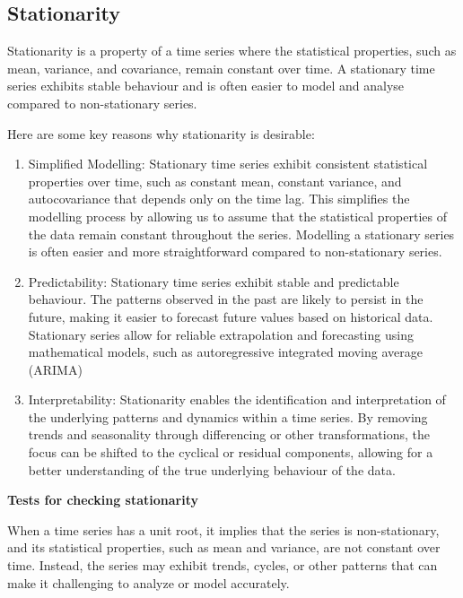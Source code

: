 \documentclass[
]{article}
\providecommand{\tightlist}{%
  \setlength{\itemsep}{0pt}\setlength{\parskip}{0pt}}
\begin{document}
\hypertarget{stationarity}{%
\subsection{Stationarity}\label{stationarity}}

Stationarity is a property of a time series where the statistical
properties, such as mean, variance, and covariance, remain constant over
time. A stationary time series exhibits stable behaviour and is often
easier to model and analyse compared to non-stationary series.~

Here are some key reasons why stationarity is desirable:

\begin{enumerate}
\def\labelenumi{\arabic{enumi}.}
\tightlist
\item
  Simplified Modelling: Stationary time series exhibit consistent
  statistical properties over time, such as constant mean, constant
  variance, and autocovariance that depends only on the time lag. This
  simplifies the modelling process by allowing us to assume that the
  statistical properties of the data remain constant throughout the
  series. Modelling a stationary series is often easier and more
  straightforward compared to non-stationary series.
\item
  Predictability: Stationary time series exhibit stable and predictable
  behaviour. The patterns observed in the past are likely to persist in
  the future, making it easier to forecast future values based on
  historical data. Stationary series allow for reliable extrapolation
  and forecasting using mathematical models, such as autoregressive
  integrated moving average (ARIMA)
\item
  Interpretability: Stationarity enables the identification and
  interpretation of the underlying patterns and dynamics within a time
  series. By removing trends and seasonality through differencing or
  other transformations, the focus can be shifted to the cyclical or
  residual components, allowing for a better understanding of the true
  underlying behaviour of the data.
\end{enumerate}

\textbf{Tests for checking stationarity}

When a time series has a unit root, it implies that the series is
non-stationary, and its statistical properties, such as mean and
variance, are not constant over time. Instead, the series may exhibit
trends, cycles, or other patterns that can make it challenging to
analyze or model accurately.
\end{document}
